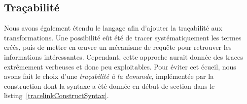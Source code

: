 %
%

\subsection{Traçabilité}
\label{ch:outils:trace}

Nous avons également étendu le langage afin d'ajouter la traçabilité aux
transformations. Une possibilité eût été de tracer systématiquement les termes
créés, puis de mettre en œuvre un mécanisme de requête pour retrouver les
informations intéressantes. Cependant, cette approche aurait donnée des traces
extrêmement verbeuses et donc peu exploitables. Pour éviter cet écueil, nous
avons fait le choix d'une \emph{traçabilité à la demande}, implémentée par la
construction  dont la syntaxe a été donnée en début de section
dans le listing~\ref{tracelinkConstructSyntax}.

